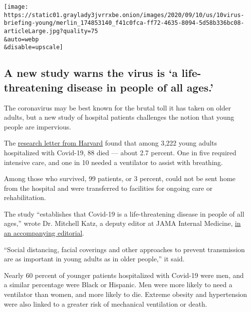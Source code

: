 \texttt{[image: https://static01.graylady3jvrrxbe.onion/images/2020/09/10/us/10virus-briefing-young/merlin\_174853140\_f41c0fca-ff72-4635-8094-5d58b336bc08-articleLarge.jpg?quality=75\\\&auto=webp\\\&disable=upscale]}

\hypertarget{a-new-study-warns-the-virus-is-a-life-threatening-disease-in-people-of-all-ages}{%
\subsection{A new study warns the virus is `a life-threatening disease
in people of all
ages.'}\label{a-new-study-warns-the-virus-is-a-life-threatening-disease-in-people-of-all-ages}}

The coronavirus may be best known for the brutal toll it has taken on
older adults, but a new study of hospital patients challenges the notion
that young people are impervious.

The
\href{https://jamanetwork.com/journals/jamainternalmedicine/fullarticle/2770542?guestAccessKey=87e8344a-8e2f-4ca8-8e1a-95be53bbf71e\&utm_source=silverchair\&utm_medium=email\&utm_campaign=article_alert-jamainternalmedicine\&utm_content=olf\&utm_term=090920}{research
letter from Harvard} found that among 3,222 young adults hospitalized
with Covid-19, 88 died --- about 2.7 percent. One in five required
intensive care, and one in 10 needed a ventilator to assist with
breathing.

Among those who survived, 99 patients, or 3 percent, could not be sent
home from the hospital and were transferred to facilities for ongoing
care or rehabilitation.

The study ``establishes that Covid-19 is a life-threatening disease in
people of all ages,'' wrote Dr. Mitchell Katz, a deputy editor at JAMA
Internal Medicine,
\href{https://jamanetwork.com/journals/jamainternalmedicine/fullarticle/2770541?guestAccessKey=8633865c-3c11-4ce2-9449-887ca6580677\&utm_source=silverchair\&utm_medium=email\&utm_campaign=article_alert-jamainternalmedicine\&utm_content=olf\&utm_term=090920}{in
an accompanying editorial}.

``Social distancing, facial coverings and other approaches to prevent
transmission are as important in young adults as in older people,'' it
said.

Nearly 60 percent of younger patients hospitalized with Covid-19 were
men, and a similar percentage were Black or Hispanic. Men were more
likely to need a ventilator than women, and more likely to die. Extreme
obesity and hypertension were also linked to a greater risk of
mechanical ventilation or death.

